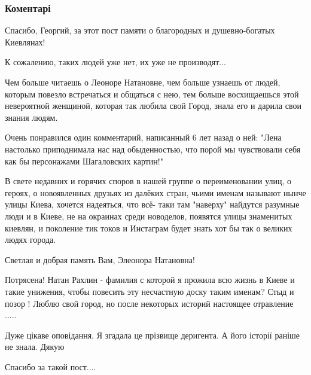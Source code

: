  
 
 
 
 
\subsubsection{Коментарі}

\begin{itemize} %

Спасибо, Георгий, за этот пост памяти о благородных и душевно-богатых
Киевлянах!

К сожалению, таких людей уже нет, их уже не производят...

Чем больше читаешь о Леоноре Натановне, чем больше узнаешь от людей, которым
повезло встречаться и общаться с нею, тем больше восхищаешься этой невероятной
женщиной, которая так любила свой Город, знала его и дарила свои знания людям.

Очень понравился один комментарий, написанный 6 лет назад о ней: "Лена
настолько приподнимала нас над обыденностью, что порой мы чувствовали себя как
бы персонажами Шагаловских картин!"

В свете недавних и горячих споров в нашей группе о переименовании улиц, о
героях, о новоявленных друзьях из далёких стран, чьими именам называют нынче
улицы Киева, хочется надеяться, что всё- таки там "наверху" найдутся разумные
люди и в Киеве, не на окраинах среди новоделов, появятся улицы знаменитых
киевлян, и поколение тик токов и Инстаграм будет знать хот бы так о великих
людях города.

Светлая и добрая память Вам, Элеонора Натановна!


Потрясена! Натан Рахлин - фамилия с которой я прожила всю жизнь в Киеве и
такие унижения, чтобы повесить эту несчастную доску таким именам? Стыд и позор
! Люблю свой город, но после некоторых историй настоящее отравление .....

Дуже цікаве оповідання. Я згадала це прізвище деригента. А його історії раніше не знала. Дякую

Спасибо за такой пост....


\end{itemize}
